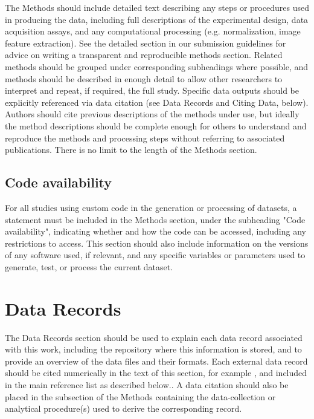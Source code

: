\documentclass[english]{article}
\begin{document}
The Methods should include detailed text describing any steps or procedures used in producing the data, including full descriptions of the experimental design, data acquisition assays, and any computational processing (e.g. normalization, image feature extraction). See the detailed section in our submission guidelines for advice on writing a transparent and reproducible methods section. Related methods should be grouped under corresponding subheadings where possible, and methods should be described in enough detail to allow other researchers to interpret and repeat, if required, the full study. Specific data outputs should be explicitly referenced via data citation (see Data Records and Citing Data, below).
Authors should cite previous descriptions of the methods under use, but ideally the method descriptions should be complete enough for others to understand and reproduce the methods and processing steps without referring to associated publications. There is no limit to the length of the Methods section.


\subsection*{Code availability}

For all studies using custom code in the generation or processing of datasets, a statement must be included in the Methods section, under the subheading "Code availability", indicating whether and how the code can be accessed, including any restrictions to access. This section should also include information on the versions of any software used, if relevant, and any specific variables or parameters used to generate, test, or process the current dataset. 


\section*{Data Records}

The Data Records section should be used to explain each data record associated with this work, including the repository where this information is stored, and to provide an overview of the data files and their formats. Each external data record should be cited numerically in the text of this section, for example \cite{cite3, cite4, cite5, cite6}, and included in the main reference list as described below.. A data citation should also be placed in the subsection of the Methods containing the data-collection or analytical procedure(s) used to derive the corresponding record.
\end{document}
